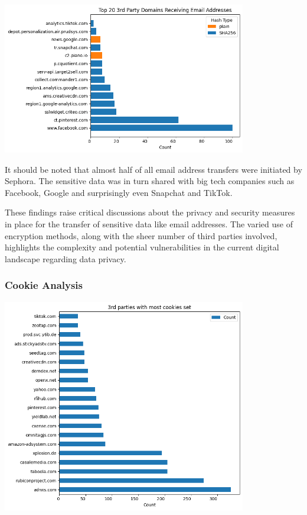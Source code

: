 \includegraphics[width=0.8\textwidth]{./assets/top20thirdpartydomainsreceivingmailaddresses.png}

It should be noted that almost half of all email address transfers were initiated by Sephora. The sensitive data was in turn shared with big tech companies such as Facebook, Google and surprisingly even Snapchat and TikTok.

These findings raise critical discussions about the privacy and security measures in place for the transfer of sensitive data like email addresses. The varied use of encryption methods, along with the sheer number of third parties involved, highlights the complexity and potential vulnerabilities in the current digital landscape regarding data privacy.


\subsubsection{Cookie Analysis}
\includegraphics[width=0.8\textwidth]{./assets/thirdpartieswithmostcookiesset.png}
\vspace{0.8cm}

